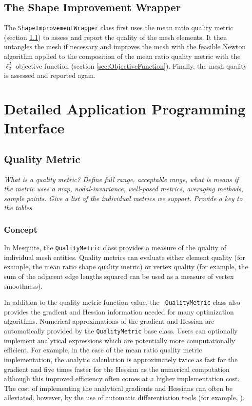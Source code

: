 \documentclass[letter]{report}
\begin{document}
\subsection{The Shape Improvement Wrapper}

The \texttt{ShapeImprovementWrapper} class 
first uses the mean ratio quality
metric (section \ref{sec:QualityMetric}) to assess and report the quality of the mesh elements. It then
untangles the mesh if necessary and improves the mesh with the
feasible Newton algorithm applied to the composition of the mean ratio
quality metric with the $\ell_2^2$ objective function (section \ref{sec:ObjectiveFunction}). Finally, the
mesh quality is assessed and reported again. 


\section{Detailed Application Programming Interface}
\label{sec:detailedAPI}

\subsection{Quality Metric} \label{sec:QualityMetric}

{\it 
What is a quality metric? Define full range, acceptable range, what is means 
if the metric uses a map, nodal-invariance, well-posed metrics, averaging 
methods, sample points. Give a list of the individual metrics we support. 
Provide a key to the tables.
}

\subsubsection{Concept}

In Mesquite, the \texttt{QualityMetric} class provides a measure of
the quality of individual mesh entities.  Quality metrics can evaluate
either element quality (for example, the mean ratio shape quality
metric) or vertex quality (for example, the sum of the adjacent edge
lengths squared can be used as a measure of vertex smoothness).  

In addition to the quality metric function value, the {\tt
QualityMetric} class also provides the gradient and Hessian
information needed for many optimization algorithms.  Numerical
approximations of the gradient and Hessian are automatically provided
by the \texttt{QualityMetric} base class.  Users can optionally
implement analytical expressions which are potentially more
computationally efficient.  For example, in the case of the mean ratio
quality metric implementation, the analytic calculation is
approximately twice as fast for the gradient and five times faster for the Hessian
as the numerical computation although this
improved efficiency often comes at a higher implementation cost.  The
cost of implementing the analytical gradients and Hessians can often
be alleviated, however, by the use of automatic differentiation tools
(for example, \cite{bischofadic}).
\end{document}
